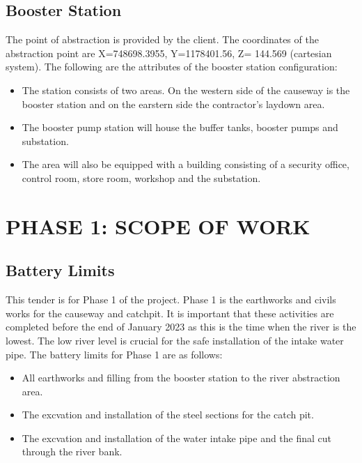 \documentclass{article}%
\begin{document}
\subsection{Booster Station}%
\label{subsec:BoosterStation}%
The point of abstraction is provided by the client. The coordinates of the abstraction point are X=748698.3955, Y=1178401.56, Z= 144.569 (cartesian system).%
\newline%
%
\newline%
%
The following are the attributes of the booster station configuration:%
\begin{itemize}%
\item%
The station consists of two areas. On the western side of the causeway is the booster station and on the earstern side the contractor's laydown area.%
\item%
The booster pump station will house the buffer tanks, booster pumps and substation.%
\item%
The area will also be equipped with a building consisting of a security office, control room, store room, workshop and the substation.%
\end{itemize}

%
\newpage%
\section{PHASE 1: SCOPE OF WORK}%
\label{sec:PHASE1SCOPEOFWORK}%
\subsection{Battery Limits}%
\label{subsec:BatteryLimits}%
This tender is for Phase 1 of the project. Phase 1 is the earthworks and civils works for the causeway and catchpit. It is important that these activities are completed before the end of January 2023 as this is the time when the river is the lowest. The low river level is crucial for the safe installation of the intake water pipe.%
\newline%
%
\newline%
%
The battery limits for Phase 1 are as follows:%
\begin{itemize}%
\item%
All earthworks and filling from the booster station to the river abstraction area.%
\item%
The excvation and installation of the steel sections for the catch pit.%
\item%
The excvation and installation of the water intake pipe and the final cut through the river bank.%
\end{itemize}
\end{document}
